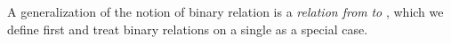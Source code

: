 \documentclass[a4paper,UKenglish,cleveref,autoref,thm-restate,11pt]{lipics-v2021}
\begin{document}
A generalization of the notion of binary relation is a \emph{relation from}  \emph{to} , which we define first and treat binary relations on a single  as a special case.
\ccpad
\begin{code}
\>[1]\AgdaSpace{}%
\AgdaSymbol{:}\AgdaSpace{}%
%
\AgdaSpace{}%
\AgdaSpace{}%
%
\AgdaSpace{}%
\AgdaSpace{}%
\AgdaSymbol{(}\AgdaSpace{}%
\AgdaSymbol{:}\AgdaSpace{}%
\AgdaSymbol{)}\AgdaSpace{}%
\AgdaSpace{}%
\AgdaSymbol{(}\AgdaSpace{}%
\AgdaSpace{}%
\AgdaSpace{}%
\AgdaSpace{}%
\AgdaSpace{}%
\AgdaSymbol{)}%
\<%
\\
%
\>[1]\AgdaSpace{}%
\AgdaSpace{}%
\AgdaSpace{}%
\AgdaSpace{}%
\AgdaSymbol{=}\AgdaSpace{}%
\AgdaSpace{}%
\AgdaSpace{}%
\AgdaSpace{}%
\AgdaSpace{}%
%
\<%
\\
%
\\[\AgdaEmptyExtraSkip]%
%
\>[1]\AgdaSpace{}%
\AgdaSymbol{:}\AgdaSpace{}%
%
\AgdaSpace{}%
\AgdaSpace{}%
\AgdaSymbol{(}\AgdaSpace{}%
\AgdaSymbol{:}\AgdaSpace{}%
\AgdaSymbol{)}\AgdaSpace{}%
\AgdaSpace{}%
\AgdaSpace{}%
\AgdaSpace{}%
\AgdaSpace{}%
%
\<%
\\
%
\>[1]\AgdaSpace{}%
\AgdaSpace{}%
\AgdaSpace{}%
\AgdaSymbol{=}\AgdaSpace{}%
\AgdaSpace{}%
\AgdaSpace{}%
\AgdaSpace{}%
\<%
\end{code}
\scpad
\end{document}
